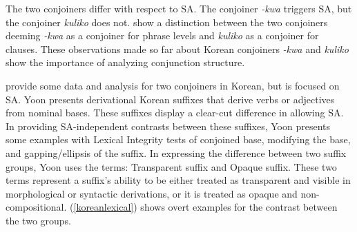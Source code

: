 The two conjoiners differ with respect to SA. The conjoiner \textit{-kwa} triggers {\Case} SA, but the conjoiner \textit{kuliko} does not. \cite{yoon2005conjunction} show a distinction between the two conjoiners deeming \textit{-kwa} as a conjoiner for phrase levels and \textit{kuliko} as a conjoiner for clauses. These observations made so far about Korean conjoiners \textit{-kwa} and \textit{kuliko} show the importance of analyzing conjunction structure.

\cite{yoon2005conjunction} provide some data and analysis for two conjoiners in Korean, but \cite{yoon2017lexical} is focused on SA. Yoon presents derivational Korean suffixes that derive verbs or adjectives from nominal bases. These suffixes display a clear-cut difference in allowing SA. In providing SA-independent contrasts between these suffixes, Yoon presents some examples with Lexical Integrity tests of conjoined base, modifying the base, and gapping/ellipsis of the suffix. In expressing the difference between two suffix groups, Yoon uses the terms: Transparent suffix and Opaque suffix. These two terms represent a suffix's ability to be either treated as transparent and visible in morphological or syntactic derivations, or it is treated as opaque and non-compositional. (\ref{koreanlexical}) shows overt examples for the contrast between the two groups.


